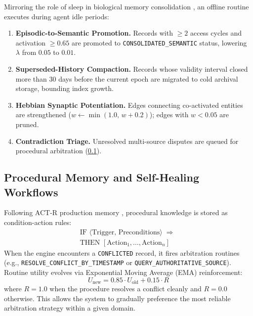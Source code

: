 \documentclass[11pt,a4paper,twocolumn]{article}
\begin{document}
Mirroring the role of sleep in biological memory consolidation
\citep{mcclelland1995cls,diekelmann2010memory}, an offline routine
executes during agent idle periods:
\begin{enumerate}[label=(\arabic*),leftmargin=*]
  \item \textbf{Episodic-to-Semantic Promotion.}  Records with $\ge 2$
        access cycles and activation $\ge 0.65$ are promoted to
        \texttt{CONSOLIDATED\_SEMANTIC} status, lowering $\lambda$ from
        $0.05$ to $0.01$.
  \item \textbf{Superseded-History Compaction.}  Records whose validity
        interval closed more than 30 days before the current epoch are
        migrated to cold archival storage, bounding index growth.
  \item \textbf{Hebbian Synaptic Potentiation.}  Edges connecting
        co-activated entities are strengthened
        ($w \leftarrow \min(1.0,\, w + 0.2)$); edges with
        $w < 0.05$ are pruned.
  \item \textbf{Contradiction Triage.}  Unresolved multi-source disputes
        are queued for procedural arbitration (\cref{sec:procedural}).
\end{enumerate}

\subsection{Procedural Memory and Self-Healing Workflows}
\label{sec:procedural}

Following ACT-R production memory \citep{anderson1993rules}, procedural
knowledge is stored as condition-action rules:
\begin{equation}
\begin{aligned}
\text{IF } \langle\text{Trigger},\,\text{Preconditions}\rangle
\;\Rightarrow\;\\
\text{THEN } [\text{Action}_1, \dots, \text{Action}_n]
\end{aligned}
\label{eq:rule}
\end{equation}
When the engine encounters a \texttt{CONFLICTED} record, it fires
arbitration routines (e.g., \texttt{RESOLVE\_CONFLICT\_BY\_TIMESTAMP}
or \texttt{QUERY\_AUTHORITATIVE\_SOURCE}).  Routine utility evolves via
Exponential Moving Average (EMA) reinforcement:
\begin{equation}
  U_{\text{new}} = 0.85\cdot U_{\text{old}} + 0.15 \cdot R
  \label{eq:ema}
\end{equation}
where $R = 1.0$ when the procedure resolves a conflict cleanly and
$R = 0.0$ otherwise.  This allows the system to gradually preference
the most reliable arbitration strategy within a given domain.
\end{document}
